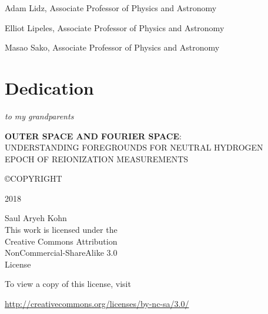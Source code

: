 \documentclass[12pt,twoside,openany]{book}
\makeatletter
\newcommand{\doublespaced}{\renewcommand{\baselinestretch}{2}\normalfont}
\newcommand{\unchapter}[1]{%
  \begingroup
  \let\@makechapterhead\@gobble %
  \chapter{#1}
  \endgroup
}
\newcommand{\tita}{{\bf OUTER SPACE AND FOURIER SPACE}:\\UNDERSTANDING FOREGROUNDS FOR NEUTRAL HYDROGEN\\EPOCH OF REIONIZATION MEASUREMENTS}
\makeatother
\begin{document}
\noindent Adam Lidz, Associate Professor of Physics and Astronomy

\noindent Elliot Lipeles, Associate Professor of Physics and Astronomy

\noindent Masao Sako, Associate Professor of Physics and Astronomy

\newpage

\pagestyle{plain}
\unchapter{Dedication}
\vspace*{2in}
\begin{center}
{\large\emph{to my grandparents}}
\end{center}

\newpage


\thispagestyle{empty} %

\vspace*{\fill}

\begin{flushleft}
{\tita }

\copyright \space COPYRIGHT
 
2018

Saul Aryeh Kohn\\[24 pt] %

This work is licensed under the \\
Creative Commons Attribution \\
NonCommercial-ShareAlike 3.0 \\
License

To view a copy of this license, visit

\url{http://creativecommons.org/licenses/by-nc-sa/3.0/}
\end{flushleft}


\end{document}
